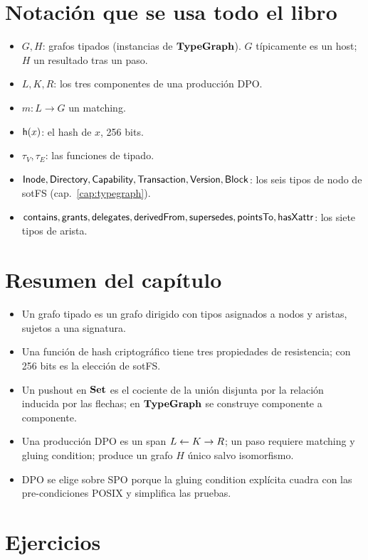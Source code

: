 \section{Notación que se usa todo el libro}

\begin{itemize}
  \item $G, H$: grafos tipados (instancias de $\mathbf{TypeGraph}$). $G$ típicamente
    es un host; $H$ un resultado tras un paso.
  \item $L, K, R$: los tres componentes de una producción DPO.
  \item $m: L \to G$ un matching.
  \item $\mathsf{h}(x)$: el hash \blake{} de $x$, 256 bits.
  \item $\tau_V, \tau_E$: las funciones de tipado.
  \item $\textsf{Inode}, \textsf{Directory}, \textsf{Capability}, \textsf{Transaction}, \textsf{Version}, \textsf{Block}$: los seis tipos de nodo
    de sotFS (cap.~\ref{cap:typegraph}).
  \item $\textsf{contains}, \textsf{grants}, \textsf{delegates}, \textsf{derivedFrom},
    \textsf{supersedes}, \textsf{pointsTo}, \textsf{hasXattr}$: los siete tipos de arista.
\end{itemize}

\section*{Resumen del capítulo}

\begin{itemize}
  \item Un grafo tipado es un grafo dirigido con tipos asignados a
    nodos y aristas, sujetos a una signatura.
  \item Una función de hash criptográfico tiene tres propiedades de
    resistencia; \blake{} con 256 bits es la elección de sotFS.
  \item Un pushout en $\mathbf{Set}$ es el cociente de la unión disjunta por la
    relación inducida por las flechas; en $\mathbf{TypeGraph}$ se construye
    componente a componente.
  \item Una producción DPO es un span $L \leftarrow K \rightarrow R$; un paso requiere
    matching y gluing condition; produce un grafo $H$ único salvo
    isomorfismo.
  \item DPO se elige sobre SPO porque la gluing condition explícita
    cuadra con las pre-condiciones POSIX y simplifica las pruebas.
\end{itemize}

\section*{Ejercicios}

